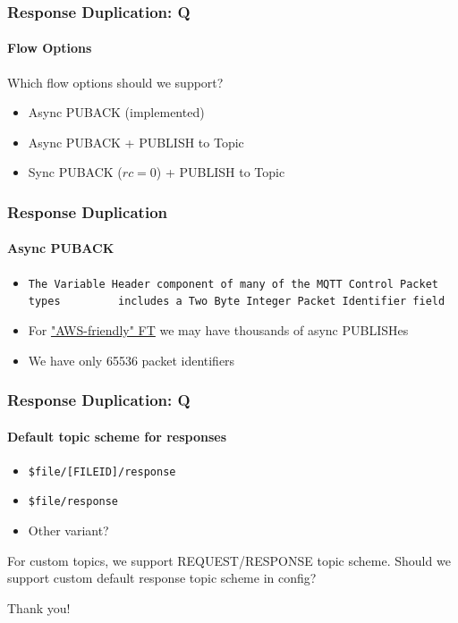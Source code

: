\documentclass{beamer}
\begin{document}
\begin{frame}
    \frametitle{Response Duplication: Q}
    \framesubtitle{Flow Options}
    Which flow options should we support?
    \begin{itemize}
        \item Async PUBACK (implemented)
        \item Async PUBACK + PUBLISH to Topic
        \item Sync PUBACK ($rc = 0$) + PUBLISH to Topic
    \end{itemize}
\end{frame}

\begin{frame}
    \frametitle{Response Duplication}
    \framesubtitle{Async PUBACK}
    \begin{itemize}
        \item \lstinline{The Variable Header component of many of the MQTT Control Packet types
        includes a Two Byte Integer Packet Identifier field}
        \item For \href{https://emqx.atlassian.net/l/cp/YDANuEv9}{"AWS-friendly" FT} we may have thousands of async PUBLISHes
        \item We have only 65536 packet identifiers
    \end{itemize}
\end{frame}

\begin{frame}
    \frametitle{Response Duplication: Q}
    \framesubtitle{Default topic scheme for responses}
    \begin{itemize}
        \item \lstinline{$file/[FILEID]/response}
        \item \lstinline{$file/response}
        \item Other variant?
    \end{itemize}
    For custom topics, we support REQUEST/RESPONSE topic scheme. Should we support custom
    default response topic scheme in config?
\end{frame}

\begin{frame}
    \begin{center}
        Thank you!
    \end{center}
\end{frame}
\end{document}
